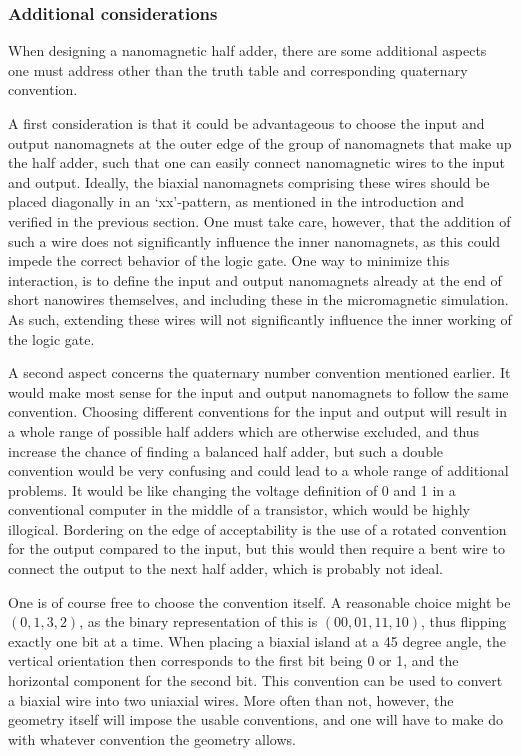 \documentclass[11pt,a4paper,english]{article}
\begin{document}
\subsubsection{Additional considerations}
When designing a nanomagnetic half adder, there are some additional aspects one must address other than the truth table and corresponding quaternary convention. \par
A first consideration is that it could be advantageous to choose the input and output nanomagnets at the outer edge of the group of nanomagnets that make up the half adder, such that one can easily connect nanomagnetic wires to the input and output. Ideally, the biaxial nanomagnets comprising these wires should be placed diagonally in an `xx'-pattern, as mentioned in the introduction and verified in the previous section. One must take care, however, that the addition of such a wire does not significantly influence the inner nanomagnets, as this could impede the correct behavior of the logic gate. One way to minimize this interaction, is to define the input and output nanomagnets already at the end of short nanowires themselves, and including these in the micromagnetic simulation. As such, extending these wires will not significantly influence the inner working of the logic gate. \par
A second aspect concerns the quaternary number convention mentioned earlier. It would make most sense for the input and output nanomagnets to follow the same convention. Choosing different conventions for the input and output will result in a whole range of possible half adders which are otherwise excluded, and thus increase the chance of finding a balanced half adder, but such a double convention would be very confusing and could lead to a whole range of additional problems. It would be like changing the voltage definition of 0 and 1 in a conventional computer in the middle of a transistor, which would be highly illogical. Bordering on the edge of acceptability is the use of a rotated convention for the output compared to the input, but this would then require a bent wire to connect the output to the next half adder, which is probably not ideal. \par
One is of course free to choose the convention itself. A reasonable choice might be $(0,1,3,2)$, as the binary representation of this is $(00, 01, 11, 10)$, thus flipping exactly one bit at a time. When placing a biaxial island at a 45 degree angle, the vertical orientation then corresponds to the first bit being 0 or 1, and the horizontal component for the second bit. This convention can be used to convert a biaxial wire into two uniaxial wires. More often than not, however, the geometry itself will impose the usable conventions, and one will have to make do with whatever convention the geometry allows. \par
\end{document}
